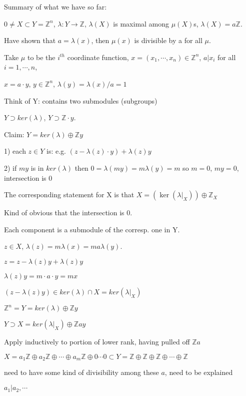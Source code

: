 \documentclass[12pt]{article}
\begin{document}
\noindent
Summary of what we have so far:

$0 \neq X \subset Y = \mathds{Z}^n$, $\lambda: Y \to \mathds{Z}$, $\lambda(X)$ is maximal among $\mu(X)$s, $\lambda(X) = a\mathds{Z}$.

Have shown that $a = \lambda(x)$, then $\mu(x)$ is divisible by a for all $\mu$.

Take $\mu$ to be the $i^{th}$ coordinate function, $x = (x_1, \cdots, x_n) \in \mathds{Z}^n$, $a|x_i$ for all $i = 1, \cdots, n$, 

$x = a \cdot y$, $y \in \mathds{Z}^n$, $\lambda(y) = \lambda(x)/a = 1$

\noindent
Think of Y: contains two submodules (subgroups)

$Y \supset ker(\lambda)$, $Y \supset \mathds{Z} \cdot y$.

Claim: $Y = ker(\lambda) \oplus \mathds{Z}y$

1) each $z \in Y$ is: e.g. $(z - \lambda(z) \cdot y) + \lambda(z)y$

2) if $my$ is in $ker(\lambda)$ then $0 = \lambda(my) = m\lambda(y) = m$ so $m = 0$, $my = 0$, intersection is 0

\noindent
The corresponding statement for X is that $X = (\ker(\lambda|_X)) \oplus \mathds{Z}_X$

Kind of obvious that the intersection is 0.

Each component is a submodule of the corresp. one in Y.

$z \in X$, $\lambda(z) = m\lambda(x) = ma\lambda(y)$.

$z = z - \lambda(z)y + \lambda(z)y$

$\lambda(z)y = m\cdot a\cdot y = mx$

$(z - \lambda(z)y) \in ker(\lambda) \cap X = ker(\lambda|_X)$

\noindent
$\mathds{Z}^n = Y = ker(\lambda) \oplus \mathds{Z}y$

$Y \supset X = ker(\lambda|_X) \oplus \mathds{Z}ay$

Apply inductively to portion of lower rank, having pulled off $\mathds{Z}a$

\noindent
$X = a_1\mathds{Z} \oplus a_2\mathds{Z} \oplus \cdots \oplus a_m\mathds{Z} \oplus 0 \cdots 0 \subset Y = \mathds{Z} \oplus \mathds{Z} \oplus \mathds{Z} \oplus \cdots \oplus \mathds{Z}$

need to have some kind of divisibility among these $a$, need to be explained

$a_1|a_2, \cdots$
\end{document}
